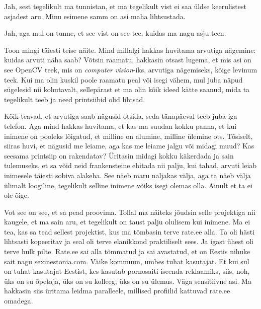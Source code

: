 Jah, sest tegelikult ma tunnistan, et ma tegelikult vist ei saa üldse keerulistest asjadest aru. Minu esimene samm on  asi maha lihtsustada. 


Jah, aga mul on tunne, et see vist on see tee, kuidas ma nagu asju teen. 

Toon mingi täiesti teise näite. Mind millalgi hakkas huvitama  arvutiga nägemine: kuidas arvuti näha saab? Võtsin raamatu, hakkasin otsast lugema, et mis asi on see OpenCV teek, mis on \emph{computer vision}-iks, arvutiga nägemiseks, kõige levinum teek. Kui ma olin kuskil poole raamatu peal või isegi vähem, mul juba näpud sügelesid nii kohutavalt, sellepärast et ma olin kõik ideed kätte saanud, mida ta tegelikult teeb ja need printsiibid olid lihtsad. 

Kõik teavad, et arvutiga saab  nägusid otsida, seda tänapäeval teeb juba iga telefon. Aga mind hakkas huvitama, et kas ma  suudan kokku panna, et kui inimene on pooleks lõigatud, et milline on alumine, milline ülemine ots. Tõsiselt, siiras huvi, et nägusid me leiame, aga kas me leiame jalgu või midagi muud? Kas seesama printsiip on rakendatav? Üritasin midagi kokku käkerdada ja sain tulemuseks, et sa võid neid frankensteine ehitada nii palju, kui tahad, arvuti leiab inimesele täiesti sobiva alakeha. See näeb maru naljakas välja, aga ta näeb välja ülimalt loogiline, tegelikult selline inimene võiks isegi olemas olla. Ainult et ta ei ole õige. 

Vot see on see, et sa pead proovima. Tollal ma näiteks jõudsin selle projektiga nii kaugele, et ma sain aru, et tegelikult on taust palju olulisem kui inimene. Ma ei tea, kas sa tead sellest projektist, kus ma tõmbasin terve rate.ee alla. Ta oli hästi lihtsasti kopeeritav ja  seal oli terve elanikkond praktiliselt sees. Ja igast ühest oli terve hulk pilte. Rate.ee sai alla tõmmatud ja sai avastatud, et on Eestis nihuke sait nagu sexinestonia.com. Väike kommuun, umbes tuhat kasutajat. Et kui sul on tuhat kasutajat Eestist, kes kasutab pornosaiti  iseenda reklaamiks, siis, noh, üks on su õpetaja, üks on su kolleeg, üks on su ülemus. Väga  sensitiivne asi. Ma hakkasin siis üritama leidma  paralleele, millised profiilid kattuvad rate.ee omadega. 



